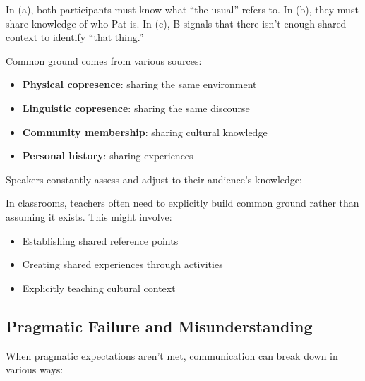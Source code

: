 \ea
    \z
\z

In (a), both participants must know what ``the usual'' refers to. In (b), they must share knowledge of who Pat is. In (c), B signals that there isn't enough shared context to identify ``that thing.''

Common ground comes from various sources:
\begin{itemize}
    \item \textbf{Physical copresence}: sharing the same environment
    \item \textbf{Linguistic copresence}: sharing the same discourse
    \item \textbf{Community membership}: sharing cultural knowledge
    \item \textbf{Personal history}: sharing experiences
\end{itemize}

Speakers constantly assess and adjust to their audience's knowledge:
\ea
    \z
\z

In classrooms, teachers often need to explicitly build common ground rather than assuming it exists. This might involve:
\begin{itemize}
    \item Establishing shared reference points
    \item Creating shared experiences through activities
    \item Explicitly teaching cultural context
\end{itemize}

\subsection{Pragmatic Failure and Misunderstanding}
When pragmatic expectations aren't met, communication can break down in various ways:

